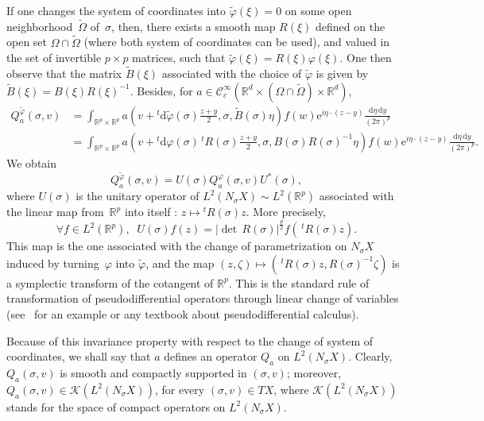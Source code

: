 \documentclass[10pt]{amsart}
\theoremstyle{definition}
\DeclareMathOperator{\dett}{det}
\newcommand*\R{{\mathbb R}}
\numberwithin{equation}{section}
\newcommand{\ee}{{\mathrm e}}
\let\oldforall\forall
\renewcommand*{\forall}{\mathrel{\oldforall}}
\newcommand*{\dd}{\mathrm{d}}
\newcommand*{\dy}{\dd y}
\newcommand*{\deta}{\dd \eta}
\newcommand*{\dphi}{\dd \varphi}
\begin{document}

If one changes the system of coordinates into $\widetilde\varphi(\xi)=0$ on some open neighborhood~$\widetilde\Omega$ of~$\sigma$, then, there exists a smooth map $R(\xi)$ defined on the open set $\Omega\cap\widetilde\Omega$ (where both system of coordinates can be used), and valued in the set of invertible $p\times p$ matrices, such that $\widetilde \varphi(\xi)=R(\xi) \varphi(\xi)$. One then observe that the matrix $\widetilde B(\xi)$ associated with the choice of $\widetilde \varphi$ is given by $\widetilde B(\xi)=B(\xi)R(\xi)^{-1}.$ Besides, for $a\in {\mathcal C}^\infty_c(\R^d\times (\Omega\cap \widetilde\Omega) \times \R^d)$,
\begin{align*}
Q_a^{\widetilde \varphi} (\sigma,v)& =
\int_{\R^p\times \R^p}a\left(v+ {}^t\mathrm{d}\widetilde\varphi(\sigma) \frac{z+y}{2},\sigma, \widetilde B(\sigma) \eta\right)f(w){\ee}^{i\eta\cdot (z-y)}\frac{\deta\,\dy}{(2\pi)^p}\\
& = \int_{\R^p\times \R^p}a\left(v+ {}^t\dphi(\sigma) \,^tR(\sigma) \frac{z+y}{2},\sigma, B(\sigma)R(\sigma)^{-1} \eta\right)f(w){\ee}^{i\eta\cdot (z-y)}\frac{\deta\,\dy}{(2\pi)^p}.
\end{align*}
We obtain
\[
Q_a^{\widetilde \varphi} (\sigma,v)= U(\sigma)Q_a^{\varphi}(\sigma,v)U^*(\sigma),
\]
where $U(\sigma)$ is the unitary operator of $L^2(N_\sigma X)\sim L^2(\R^p)$ associated with the linear map from~$\R^p$ into itself : $ z\mapsto {}^tR(\sigma) z$. More precisely,
\[
\forall f\in L^2(\R^p),\;\; U(\sigma) f(z)= \left|{\dett} \,R(\sigma)\right|^\frac{p}{2} f(\,^tR(\sigma)z).
\]
This map is the one associated with the change of parametrization on $N_\sigma X$\linebreak induced by turning~$\varphi$ into $\widetilde\varphi$, and the map $(z,\zeta)\mapsto (\,^tR(\sigma)z,R(\sigma)^{-1}\zeta)$ is a symplectic transform of the cotangent of $\R^p$. This is the standard rule of transformation of pseudodifferential operators through linear change of variables (see~\cite{AlinhacGerard} for an example or any textbook about pseudodifferential calculus).


Because of this invariance property with respect to the change of system of coordinates, we shall say that $a$ defines an operator $Q_a$ on $L^2(N_\sigma X)$. Clearly, $Q_a(\sigma,v)$ is smooth and compactly supported in $(\sigma,v)$; moreover, $Q_a(\sigma,v)\in\mathcal{K}(L^2(N_\sigma X))$, for every $(\sigma,v)\in TX$, where $\mathcal{K}(L^2(N_\sigma X))$ stands for the space of compact operators on $L^2(N_\sigma X)$.
\end{document}
